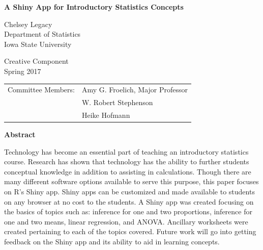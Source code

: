 \documentclass[11pt]{book}
\begin{document}
\begin{titlepage}
    \begin{center}
                
        \Large
        \textbf{A Shiny App for Introductory Statistics Concepts}
        
      
        \vspace{1cm}
       
        
        \Large
        Chelsey Legacy \\
        \vspace{0.25cm}
        Department of Statistics\\
          \vspace{0.25cm}
        Iowa State University\\
       
        
        \vspace{1cm}
               
           Creative Component\\
             \vspace{0.25cm}
           Spring 2017
           
           \vspace{2cm}
         
				\begin{center}
				\begin{tabular}{rl}
				Committee Members: & Amy G. Froelich, Major Professor\\
				 & W. Robert Stephenson \\
				 & Heike Hofmann\\
				\end{tabular}
				\end{center}
           
    \end{center}
\end{titlepage}







\begin{center}
\textbf{Abstract}
\end{center}
Technology has become an essential part of teaching an introductory statistics course. Research has shown that technology has the ability to further students conceptual knowledge in addition to assisting in calculations. Though there are many different software options available to serve this purpose, this paper focuses on R's Shiny app. Shiny apps can be customized and made available to students on any browser at no cost to the students. A Shiny app was created focusing on the basics of topics such as: inference for one and two proportions, inference for one and two means, linear regression, and ANOVA. Ancillary worksheets were created pertaining to each of the topics covered. Future work will go into getting feedback on the Shiny app and its ability to aid in learning concepts.
\end{document}
